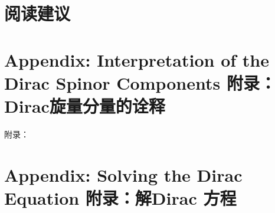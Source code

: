 \section*{阅读建议}

\section[附录：Dirac旋量分量的诠释]{Appendix: Interpretation of the Dirac Spinor Components \quad 附录：Dirac旋量分量的诠释}附录：\label{sec8.8}

\section[附录：解Dirac 方程]{Appendix: Solving the Dirac Equation 附录：解Dirac 方程}\label{sec8.9}

